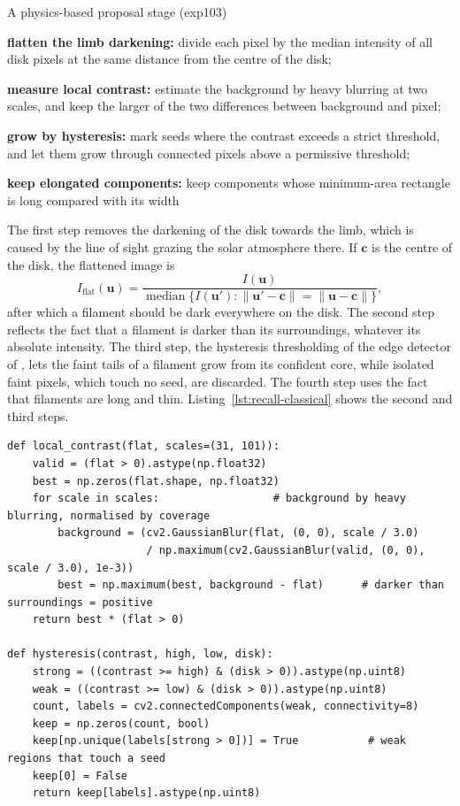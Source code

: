 \begin{algorithmblock}{A physics-based proposal stage (exp103)\label{alg:recall-classical}}
\item \textbf{flatten the limb darkening:} divide each pixel by the median intensity of all disk pixels at the same distance from the centre of the disk;
\item \textbf{measure local contrast:} estimate the background by heavy blurring at two scales, and keep the larger of the two differences between background and pixel;
\item \textbf{grow by hysteresis:} mark seeds where the contrast exceeds a strict threshold, and let them grow through connected pixels above a permissive threshold;
\item \textbf{keep elongated components:} keep components whose minimum-area rectangle is long compared with its width
\end{algorithmblock}

The first step removes the darkening of the disk towards the limb, which is caused by the line of
sight grazing the solar atmosphere there. If $\mathbf{c}$ is the centre of the disk, the flattened
image is
\begin{equation}
I_{\text{flat}}(\mathbf{u}) = \frac{I(\mathbf{u})}{\operatorname{median}\{I(\mathbf{u}') :
\lVert\mathbf{u}'-\mathbf{c}\rVert = \lVert\mathbf{u}-\mathbf{c}\rVert\}},
\end{equation}
after which a filament should be dark everywhere on the disk. The second step reflects the fact that a
filament is darker than its surroundings, whatever its absolute intensity. The third step, the
hysteresis thresholding of the edge detector of \citet{canny1986}, lets the faint tails of a
filament grow from its confident core, while isolated faint pixels, which touch no
seed, are discarded. The fourth step uses the fact that filaments are long and thin.
Listing~\ref{lst:recall-classical} shows the second and third steps.

\begin{lstlisting}[caption={Local contrast and hysteresis. Condensed from
\file{experiments/exp\_103\_classical/src/proposals.py}.},label=lst:recall-classical]
def local_contrast(flat, scales=(31, 101)):
    valid = (flat > 0).astype(np.float32)
    best = np.zeros(flat.shape, np.float32)
    for scale in scales:                  # background by heavy blurring, normalised by coverage
        background = (cv2.GaussianBlur(flat, (0, 0), scale / 3.0)
                      / np.maximum(cv2.GaussianBlur(valid, (0, 0), scale / 3.0), 1e-3))
        best = np.maximum(best, background - flat)      # darker than surroundings = positive
    return best * (flat > 0)

def hysteresis(contrast, high, low, disk):
    strong = ((contrast >= high) & (disk > 0)).astype(np.uint8)
    weak = ((contrast >= low) & (disk > 0)).astype(np.uint8)
    count, labels = cv2.connectedComponents(weak, connectivity=8)
    keep = np.zeros(count, bool)
    keep[np.unique(labels[strong > 0])] = True           # weak regions that touch a seed
    keep[0] = False
    return keep[labels].astype(np.uint8)
\end{lstlisting}

